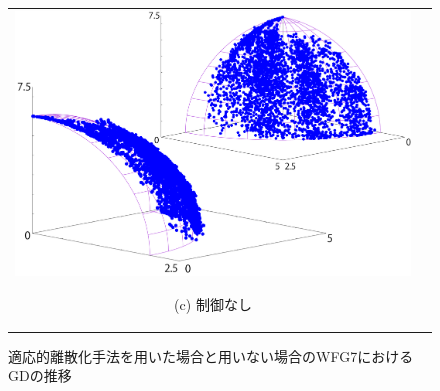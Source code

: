 \documentclass[../main/main]{subfiles}
\begin{document}
\begin{figure}[htbp]
\begin{tabular}{cc}
\begin{minipage}{0.33\hsize}
\includegraphics[width=1\linewidth]{../figures/WFG7_uc_double.pdf}
\begin{center}
{\footnotesize (c) 制御なし}
\end{center}
\end{minipage}
\end{tabular}
\caption{適応的離散化手法を用いた場合と用いない場合のWFG7におけるGDの推移}
\label{fig:nondoms_wfg7}
\end{figure}
\end{document}
